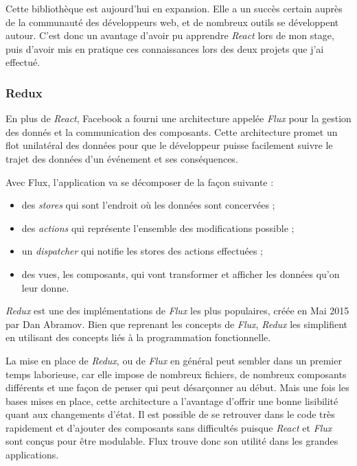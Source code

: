 Cette bibliothèque est aujourd'hui en expansion. Elle a un succès
certain auprès de la communauté des développeurs web, et de nombreux
outils se développent autour. C'est donc un avantage d'avoir pu
apprendre \emph{React} lors de mon stage, puis d'avoir mis en pratique
ces connaissances lors des deux projets que j'ai effectué.

\bigskip

\subsubsection{Redux}\label{redux}

\bigskip

En plus de \emph{React}, Facebook a fourni une architecture appelée
\emph{Flux} pour la gestion des donnés et la communication des
composants. Cette architecture promet un flot unilatéral des données
pour que le développeur puisse facilement suivre le trajet des données
d'un événement et ses conséquences.

\bigskip

Avec Flux, l'application va se décomposer de la façon suivante :

\begin{itemize}
\tightlist
\item
  des \emph{stores} qui sont l'endroit où les données sont concervées ;
\item
  des \emph{actions} qui représente l'ensemble des modifications
  possible ;
\item
  un \emph{dispatcher} qui notifie les stores des actions effectuées ;
\item
  des vues, les composants, qui vont transformer et afficher les données
  qu'on leur donne.
\end{itemize}

\bigskip

\emph{Redux} est une des implémentations de \emph{Flux} les plus
populaires, créée en Mai 2015 par Dan Abramov. Bien que reprenant les
concepts de \emph{Flux}, \emph{Redux} les simplifient en utilisant des
concepts liés à la programmation fonctionnelle.

\bigskip

La mise en place de \emph{Redux}, ou de \emph{Flux} en général peut
sembler dans un premier temps laborieuse, car elle impose de nombreux
fichiers, de nombreux composants différents et une façon de penser qui
peut désarçonner au début. Mais une fois les bases mises en place, cette
architecture a l'avantage d'offrir une bonne lisibilité quant aux
changements d'état. Il est possible de se retrouver dans le code très
rapidement et d'ajouter des composants sans difficultés puisque
\emph{React} et \emph{Flux} sont conçus pour être modulable. Flux trouve
donc son utilité dans les grandes applications.

